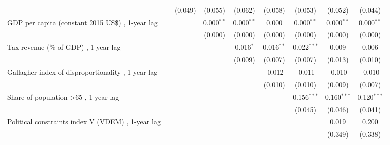 \begin{table}[htbp]
\begin{tabular}{lcccccccc}
                                                                                        &               & (0.049)       & (0.055)       & (0.062)      & (0.058)       & (0.053)       & (0.052)       & (0.044)\\   
      GDP per capita (constant 2015 US\$) , 1-year lag                                  &               &               & 0.000$^{**}$  & 0.000$^{**}$ & 0.000         & 0.000$^{**}$  & 0.000$^{**}$  & 0.000$^{**}$\\   
                                                                                        &               &               & (0.000)       & (0.000)      & (0.000)       & (0.000)       & (0.000)       & (0.000)\\   
      Tax revenue (\% of GDP) , 1-year lag                                              &               &               &               & 0.016$^{*}$  & 0.016$^{**}$  & 0.022$^{***}$ & 0.009         & 0.006\\   
                                                                                        &               &               &               & (0.009)      & (0.007)       & (0.007)       & (0.013)       & (0.010)\\   
      Gallagher index of disproportionality , 1-year lag                                &               &               &               &              & -0.012        & -0.011        & -0.010        & -0.010\\   
                                                                                        &               &               &               &              & (0.010)       & (0.010)       & (0.009)       & (0.007)\\   
      Share of population >65 , 1-year lag                                              &               &               &               &              &               & 0.156$^{***}$ & 0.160$^{***}$ & 0.120$^{***}$\\   
                                                                                        &               &               &               &              &               & (0.045)       & (0.046)       & (0.041)\\   
      Political constraints index V (VDEM) , 1-year lag                                 &               &               &               &              &               &               & 0.019         & 0.200\\   
                                                                                        &               &               &               &              &               &               & (0.349)       & (0.338)\\   

\end{tabular}
\end{table}
